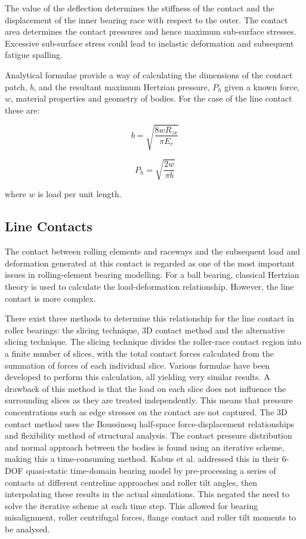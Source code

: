 The value of the deflection determines the stiffness of the contact and the displacement of the inner bearing race with respect to the outer. The contact area determines the contact pressures and hence maximum sub-surface stresses. Excessive sub-surface stress could lead to inelastic deformation and subsequent fatigue spalling.

Analytical formulae provide a way of calculating the dimensions of the contact patch, $b$, and the resultant maximum Hertzian pressure, $P_h$ given a known force, $w$, material properties and geometry of bodies. For the case of the line contact these are:

\begin{equation}\label{eq2.3}
	b=\sqrt{\frac{8 w R_{z x}}{\pi E_r}}
\end{equation}

\begin{equation}\label{eq2.4}
	P_h=\sqrt{\frac{2 w}{\pi b}}
\end{equation}

where $w$ is load per unit length.

\subsection{Line Contacts}

The contact between rolling elements and raceways and the subsequent load and deformation generated at this contact is regarded as one of the most important issues in rolling-element bearing modelling. For a ball bearing, classical Hertzian theory is used to calculate the load-deformation relationship. However, the line contact is more complex.

There exist three methods to determine this relationship for the line contact in roller bearings: the slicing technique, 3D contact method and the alternative slicing technique. The slicing technique \cite{Andreason1973} divides the roller-race contact region into a finite number of slices, with the total contact forces calculated from the summation of forces of each individual slice. Various formulae have been developed to perform this calculation, all yielding very similar results. A drawback of this method is that the load on each slice does not influence the surrounding slices as they are treated independently. This means that pressure concentrations such as edge stresses on the contact are not captured. The 3D contact method uses the Boussinesq half-space force-displacement relationships and flexibility method of structural analysis. The contact pressure distribution and normal approach between the bodies is found using an iterative scheme, making this a time-consuming method. Kabus et al. \cite{Kabus2012} addressed this in their 6-DOF quasi-static time-domain bearing model  by pre-processing a series of contacts at different centreline approaches  and roller tilt angles, then interpolating these results in the actual simulations. This negated the need to solve the iterative scheme at each time step. This allowed for bearing misalignment, roller centrifugal forces, flange contact and roller tilt moments to be analysed. 

